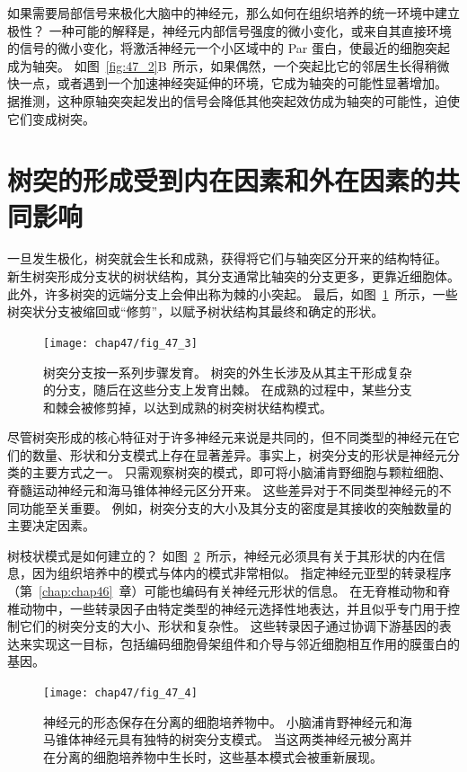 如果需要局部信号来极化大脑中的神经元，那么如何在组织培养的统一环境中建立极性？
一种可能的解释是，神经元内部信号强度的微小变化，或来自其直接环境的信号的微小变化，将激活神经元一个小区域中的 Par 蛋白，使最近的细胞突起成为轴突。
如图~\ref{fig:47_2}B~所示，如果偶然，一个突起比它的邻居生长得稍微快一点，或者遇到一个加速神经突延伸的环境，它成为轴突的可能性显著增加。
据推测，这种原轴突突起发出的信号会降低其他突起效仿成为轴突的可能性，迫使它们变成树突。



\section{树突的形成受到内在因素和外在因素的共同影响}

一旦发生极化，树突就会生长和成熟，获得将它们与轴突区分开来的结构特征。
新生树突形成分支状的树状结构，其分支通常比轴突的分支更多，更靠近细胞体。
此外，许多树突的远端分支上会伸出称为棘的小突起。
最后，如图~\ref{fig:47_3}~所示，一些树突状分支被缩回或“修剪”，以赋予树状结构其最终和确定的形状。


\begin{figure}[htbp]
	\centering
	\texttt{[image: chap47/fig\_47\_3]}
	\caption{树突分支按一系列步骤发育。
		树突的外生长涉及从其主干形成复杂的分支，随后在这些分支上发育出棘。
		在成熟的过程中，某些分支和棘会被修剪掉，以达到成熟的树突树状结构模式。}
	\label{fig:47_3}
\end{figure}


尽管树突形成的核心特征对于许多神经元来说是共同的，但不同类型的神经元在它们的数量、形状和分支模式上存在显著差异。事实上，树突分支的形状是神经元分类的主要方式之一。
只需观察树突的模式，即可将小脑浦肯野细胞与颗粒细胞、脊髓运动神经元和海马锥体神经元区分开来。
这些差异对于不同类型神经元的不同功能至关重要。
例如，树突分支的大小及其分支的密度是其接收的突触数量的主要决定因素。


树枝状模式是如何建立的？
如图~\ref{fig:47_4}~所示，神经元必须具有关于其形状的内在信息，因为组织培养中的模式与体内的模式非常相似。
指定神经元亚型的转录程序（第~\ref{chap:chap46}~章）可能也编码有关神经元形状的信息。
在无脊椎动物和脊椎动物中，一些转录因子由特定类型的神经元选择性地表达，并且似乎专门用于控制它们的树突分支的大小、形状和复杂性。
这些转录因子通过协调下游基因的表达来实现这一目标，包括编码细胞骨架组件和介导与邻近细胞相互作用的膜蛋白的基因。


\begin{figure}[htbp]
	\centering
	\texttt{[image: chap47/fig\_47\_4]}
	\caption{神经元的形态保存在分离的细胞培养物中。
		小脑浦肯野神经元和海马锥体神经元具有独特的树突分支模式。
		当这两类神经元被分离并在分离的细胞培养物中生长时，这些基本模式会被重新展现。}
	\label{fig:47_4}
\end{figure}


